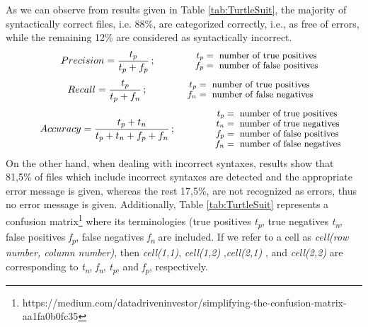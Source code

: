 As we can observe from results given in Table \ref{tab:TurtleSuit}, the majority of syntactically correct files, i.e. 88\%, are categorized correctly, i.e., as free of errors, while the remaining 12\% are considered as syntactically incorrect.
\begin{align} 
   Precision=  \frac{t_p}{t_p+f_p}\,;\qquad
\qquad\parbox{4.0cm}{\footnotesize$\begin{aligned} t_p &= \text{ number of true positives}\\[-1.0ex] f_p &= \text{ number of false positives}\end{aligned}$}
   \label{eq:1}
\end{align}
\begin{align}
   Recall =  \frac{t_p}{t_p+f_n} \,;\qquad
\qquad\parbox{4.0cm}{\footnotesize$\begin{aligned} t_p &= \text{ number of true positives}\\[-1.0ex] f_n &= \text{ number of false negatives}\end{aligned}$}
   \label{eq:2}
\end{align}
\begin{align}
   Accuracy =  \frac{t_p+t_n}{t_p+t_n+f_p+f_n} \,;\qquad
\qquad\parbox{4.0cm}{\footnotesize$\begin{aligned} t_p &= \text{ number of true positives}\\[-1.0ex]
t_n &= \text{ number of true negatives}\\[-1.0ex]
f_p &= \text{ number of false positives}\\[-1.0ex]
f_n &= \text{ number of false negatives}\end{aligned}$}
   \label{eq:3}
\end{align}
On the other hand, when dealing with incorrect syntaxes, results show that 81,5\% of files which include incorrect syntaxes are detected and the appropriate error message is given, whereas the rest 17,5\%, are not recognized as errors, thus no error message is given. Additionally, Table \ref{tab:TurtleSuit}  represents a confusion matrix\footnote{https://medium.com/datadriveninvestor/simplifying-the-confusion-matrix-aa1fa0b0fc35} where its terminologies (true positives \textit{t\textsubscript{p}}, true negatives \textit{t\textsubscript{n}},
false positives \textit{f\textsubscript{p}},
false negatives \textit{f\textsubscript{n}} are included. If we refer to a cell as \emph{cell(row number, column number)}, then \emph{cell(1,1)}, \emph{cell(1,2)}  ,\emph{cell(2,1)} , and \emph{cell(2,2)} are corresponding to \textit{t\textsubscript{n}}, 
\textit{f\textsubscript{n}}, 
\textit{t\textsubscript{p}}, 
and \textit{f\textsubscript{p}},
respectively.

